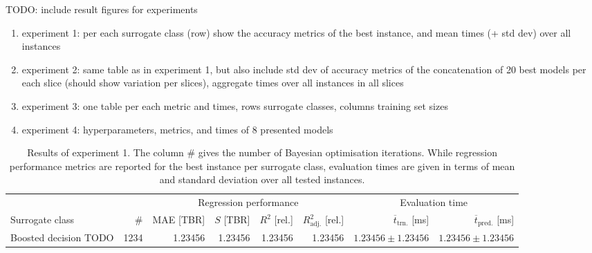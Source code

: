 TODO: include result figures for experiments

\begin{enumerate}
	\item experiment 1: per each surrogate class (row)
		show the accuracy metrics of the best instance, and mean times (+ std
		dev) over all instances
	\item experiment 2: same table as in experiment 1, but also include std dev
		of accuracy metrics of the concatenation of 20 best models per each
		slice (should show variation per slices), aggregate times over all
		instances in all slices
	\item experiment 3: one table per each metric and times, rows surrogate
		classes, columns training set sizes
	\item experiment 4: hyperparameters, metrics, and times of 8 presented models
\end{enumerate}

\begin{table}[h]
	\centering
	{\footnotesize
		\begin{tabular}{lrrrrrrr}
		\toprule
		{} & {} & \multicolumn{4}{c}{Regression performance} &
		\multicolumn{2}{c}{Evaluation time}\\
		\cmidrule(lr){3-6}
		\cmidrule(lr){7-8}
		Surrogate class & \# & MAE [TBR] & $S$ [TBR] & $R^2$ [rel.] & $R^2_{\text{adj.}}$ [rel.]
						& $\overline{t}_{\text{trn.}}$ [ms] &
						$\overline{t}_{\text{pred.}}$ [ms]\\
		\midrule
		Boosted decision TODO
						& \num{1234}
						& \num{1.23456}
						& \num{1.23456}
						& \num{1.23456}
						& \num{1.23456}
						& $\num{1.23456} \pm \num{1.23456}$
						& $\num{1.23456} \pm \num{1.23456}$
		\\
		\bottomrule
		\end{tabular}
	}
	\caption{Results of experiment 1. The column \# gives the number of
		Bayesian optimisation iterations.
		While regression performance metrics are reported for the best instance
		per surrogate class, evaluation times are given in terms of mean and standard deviation over all tested instances.}
	\label{tbl:exp1-detailed-results}
\end{table}
